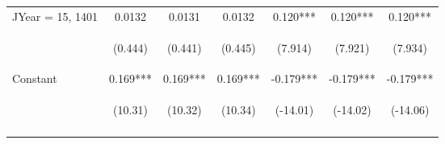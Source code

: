 \documentclass[]{article}
\begin{document}
\begin{center}
\begin{tabular}{lcccccc}
JYear = 15, 1401 & 0.0132 & 0.0131 & 0.0132 & 0.120*** & 0.120*** & 0.120*** \\
\vspace{4pt} & \begin{footnotesize}(0.444)\end{footnotesize} & \begin{footnotesize}(0.441)\end{footnotesize} & \begin{footnotesize}(0.445)\end{footnotesize} & \begin{footnotesize}(7.914)\end{footnotesize} & \begin{footnotesize}(7.921)\end{footnotesize} & \begin{footnotesize}(7.934)\end{footnotesize} \\
Constant & 0.169*** & 0.169*** & 0.169*** & -0.179*** & -0.179*** & -0.179*** \\
 & \begin{footnotesize}(10.31)\end{footnotesize} & \begin{footnotesize}(10.32)\end{footnotesize} & \begin{footnotesize}(10.34)\end{footnotesize} & \begin{footnotesize}(-14.01)\end{footnotesize} & \begin{footnotesize}(-14.02)\end{footnotesize} & \begin{footnotesize}(-14.06)\end{footnotesize} \\
\vspace{4pt} & \begin{footnotesize}\end{footnotesize} & \begin{footnotesize}\end{footnotesize} & \begin{footnotesize}\end{footnotesize} & \begin{footnotesize}\end{footnotesize} & \begin{footnotesize}\end{footnotesize} & \begin{footnotesize}\end{footnotesize} \\

\end{tabular}
\end{center}
\end{document}
